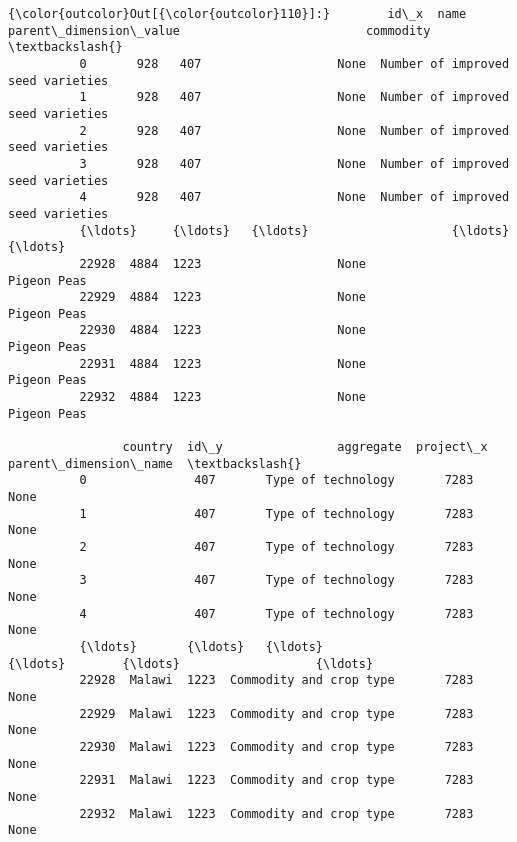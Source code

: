 \documentclass[11pt]{article}
\begin{document}
\begin{Verbatim}[commandchars=\\\{\}]
{\color{outcolor}Out[{\color{outcolor}110}]:}        id\_x  name parent\_dimension\_value                          commodity  \textbackslash{}
          0       928   407                   None  Number of improved seed varieties   
          1       928   407                   None  Number of improved seed varieties   
          2       928   407                   None  Number of improved seed varieties   
          3       928   407                   None  Number of improved seed varieties   
          4       928   407                   None  Number of improved seed varieties   
          {\ldots}     {\ldots}   {\ldots}                    {\ldots}                                {\ldots}   
          22928  4884  1223                   None                        Pigeon Peas   
          22929  4884  1223                   None                        Pigeon Peas   
          22930  4884  1223                   None                        Pigeon Peas   
          22931  4884  1223                   None                        Pigeon Peas   
          22932  4884  1223                   None                        Pigeon Peas   
          
                country  id\_y                aggregate  project\_x parent\_dimension\_name  \textbackslash{}
          0               407       Type of technology       7283                  None   
          1               407       Type of technology       7283                  None   
          2               407       Type of technology       7283                  None   
          3               407       Type of technology       7283                  None   
          4               407       Type of technology       7283                  None   
          {\ldots}       {\ldots}   {\ldots}                      {\ldots}        {\ldots}                   {\ldots}   
          22928  Malawi  1223  Commodity and crop type       7283                  None   
          22929  Malawi  1223  Commodity and crop type       7283                  None   
          22930  Malawi  1223  Commodity and crop type       7283                  None   
          22931  Malawi  1223  Commodity and crop type       7283                  None   
          22932  Malawi  1223  Commodity and crop type       7283                  None   
          

\end{Verbatim}
\end{document}
